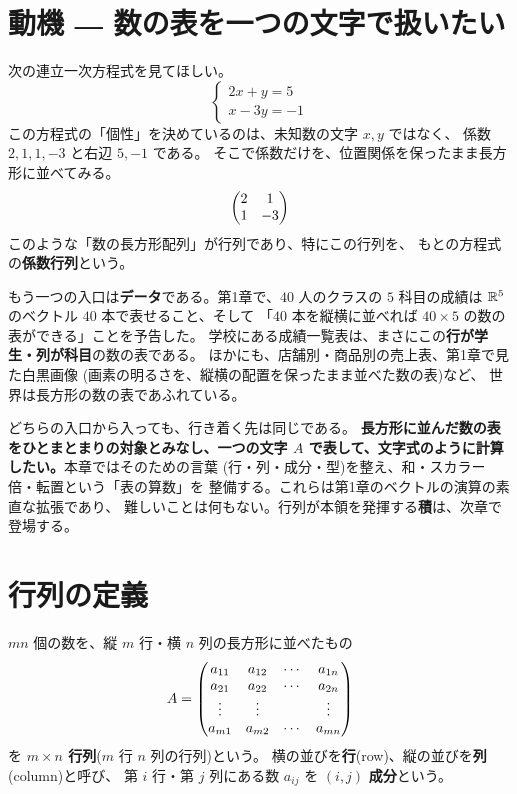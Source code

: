 \section{動機 ― 数の表を一つの文字で扱いたい}

次の連立一次方程式を見てほしい。
\[
\begin{cases}
2x + y = 5 \\
x - 3y = -1
\end{cases}
\]
この方程式の「個性」を決めているのは、未知数の文字 $x, y$ ではなく、
係数 $2, 1, 1, -3$ と右辺 $5, -1$ である。
そこで係数だけを、位置関係を保ったまま長方形に並べてみる。
\[
\begin{pmatrix}2 & 1 \\ 1 & -3\end{pmatrix}
\]
このような「数の長方形配列」が行列であり、特にこの行列を、
もとの方程式の\textbf{係数行列}という。

もう一つの入口は\textbf{データ}である。第1章で、$40$ 人のクラスの
$5$ 科目の成績は $\mathbb{R}^5$ のベクトル $40$ 本で表せること、そして
「$40$ 本を縦横に並べれば $40 \times 5$ の数の表ができる」ことを予告した。
学校にある成績一覧表は、まさにこの\textbf{行が学生・列が科目}の数の表である。
ほかにも、店舗別・商品別の売上表、第1章で見た白黒画像
(画素の明るさを、縦横の配置を保ったまま並べた数の表)など、
世界は長方形の数の表であふれている。

どちらの入口から入っても、行き着く先は同じである。
\textbf{長方形に並んだ数の表をひとまとまりの対象とみなし、一つの文字
$A$ で表して、文字式のように計算したい。}本章ではそのための言葉
(行・列・成分・型)を整え、和・スカラー倍・転置という「表の算数」を
整備する。これらは第1章のベクトルの演算の素直な拡張であり、
難しいことは何もない。行列が本領を発揮する\textbf{積}は、次章で登場する。

\section{行列の定義}

\begin{teigi}[行列]
$mn$ 個の数を、縦 $m$ 行・横 $n$ 列の長方形に並べたもの
\[
A = \begin{pmatrix}
a_{11} & a_{12} & \cdots & a_{1n} \\
a_{21} & a_{22} & \cdots & a_{2n} \\
\vdots & \vdots &        & \vdots \\
a_{m1} & a_{m2} & \cdots & a_{mn}
\end{pmatrix}
\]
を \textbf{$m \times n$ 行列}($m$ 行 $n$ 列の行列)という。
横の並びを\textbf{行}(row)、縦の並びを\textbf{列}(column)と呼び、
第 $i$ 行・第 $j$ 列にある数 $a_{ij}$ を $(i,j)$ \textbf{成分}という。
\end{teigi}

